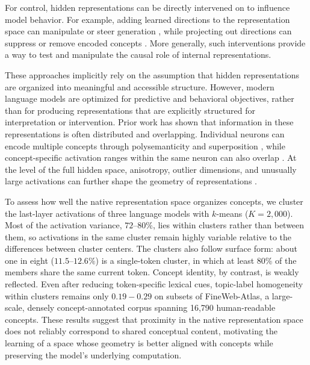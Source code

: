 \documentclass[11pt]{article}
\begin{document}
For control, hidden representations can be directly intervened on to influence model behavior. For example, adding learned directions to the representation space can manipulate or steer generation \citep{turner2023steering,li2023inference,zou2023representation,rimsky2024steering}, while projecting out directions can suppress or remove encoded concepts \citep{ravfogel2020null,belrose2023leace}. More generally, such interventions provide a way to test and manipulate the causal role of internal representations.

These approaches implicitly rely on the assumption that hidden representations are organized into meaningful and accessible structure. However, modern language models are optimized for predictive and behavioral objectives, rather than for producing representations that are explicitly structured for interpretation or intervention. Prior work has shown that information in these representations is often distributed and overlapping. Individual neurons can encode multiple concepts through polysemanticity and superposition \citep{elhage2022toy,gurnee2023finding}, while concept-specific activation ranges within the same neuron can also overlap \citep{haider2026neurons}. At the level of the full hidden space, anisotropy, outlier dimensions, and unusually large activations can further shape the geometry of representations \citep{gao2019representation,ethayarajh2019contextual,kovaleva2021bert,timkey2021all,puccetti2022outlier,sun2024massive}. 

To assess how well the native representation space organizes concepts, we cluster the last-layer activations of three language models with $k$-means ($K=2{,}000$). Most of the activation variance, $72$--$80\%$, lies within clusters rather than between them, so activations in the same cluster remain highly variable relative to the differences between cluster centers. The clusters also follow surface form: about one in eight ($11.5$--$12.6\%$) is a single-token cluster, in which at least 80\% of the members share the same current token. Concept identity, by contrast, is weakly reflected. Even after reducing token-specific lexical cues, topic-label homogeneity within clusters remains only $0.19-0.29$ on subsets of FineWeb-Atlas, a large-scale, densely concept-annotated corpus spanning 16,790 human-readable concepts. These results suggest that proximity in the native representation space does not reliably correspond to shared conceptual content, motivating the learning of a space whose geometry is better aligned with concepts while preserving the model's underlying computation.
\end{document}
